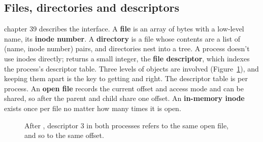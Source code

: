 \documentclass[11pt,a4paper]{article}
\begin{document}
\subsection{Files, directories and descriptors}

\OSTEP chapter 39 describes the interface. A \textbf{file} is an array of bytes with a low-level name, its
\textbf{inode number}. A \textbf{directory} is a file whose contents are a list of (name, inode number) pairs, and
directories nest into a tree. A process doesn't use inodes directly;  returns a small integer, the
\textbf{file descriptor}, which indexes the process's descriptor table. Three levels of objects are involved
(Figure~\ref{fig:vfs}), and keeping them apart is the key to getting  and  right. The descriptor
table is per process. An \textbf{open file} records the current offset and access mode and can be shared, so after
 the parent and child share one offset. An \textbf{in-memory inode} exists once per file no matter how many
times it is open.

\begin{figure}[htbp]
\centering
{}
\caption{After , descriptor 3 in both processes refers to the same open file, and so to the same offset.}
\label{fig:vfs}
\end{figure}
\end{document}
